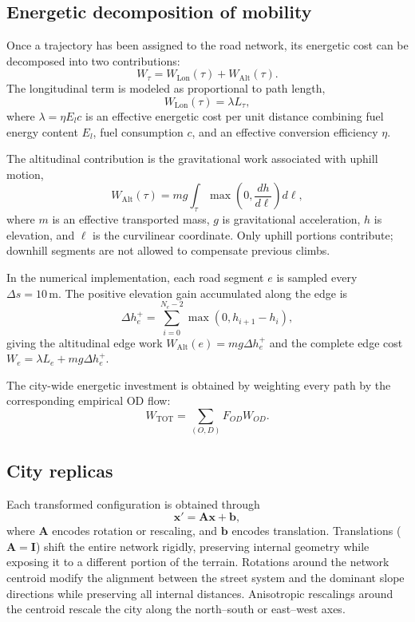 \documentclass[twocolumn,amsmath,amssymb,floatfix,nature,shownopacs,footinbib,superscriptaddress]{revtex4-2}
\begin{document}
\subsection*{Energetic decomposition of mobility}

Once a trajectory has been assigned to the road network, its energetic cost can be decomposed into two contributions:
\[
W_\tau = W_{\mathrm{Lon}}(\tau)+W_{\mathrm{Alt}}(\tau).
\]
The longitudinal term is modeled as proportional to path length,
\[
W_{\mathrm{Lon}}(\tau)=\lambda L_\tau,
\]
where $\lambda=\eta E_l c$ is an effective energetic cost per unit distance combining fuel energy content $E_l$, fuel consumption $c$, and an effective conversion efficiency $\eta$.

The altitudinal contribution is the gravitational work associated with uphill motion,
\[
W_{\mathrm{Alt}}(\tau) = m g \int_\tau \max\!\left(0,\frac{dh}{d\ell}\right) d\ell,
\]
where $m$ is an effective transported mass, $g$ is gravitational acceleration, $h$ is elevation, and $\ell$ is the curvilinear coordinate. Only uphill portions contribute; downhill segments are not allowed to compensate previous climbs.

In the numerical implementation, each road segment $e$ is sampled every $\Delta s=10\,\mathrm{m}$. The positive elevation gain accumulated along the edge is
\[
\Delta h_e^{+} = \sum_{i=0}^{N_e-2} \max(0,h_{i+1}-h_i),
\]
giving the altitudinal edge work $W_{\mathrm{Alt}}(e)=m g \Delta h_e^{+}$ and the complete edge cost $W_e = \lambda L_e + m g \Delta h_e^{+}$.

The city-wide energetic investment is obtained by weighting every path by the corresponding empirical OD flow:
\[
W_{\mathrm{TOT}} = \sum_{(O,D)}F_{OD}W_{OD}.
\]

\subsection*{City replicas}

Each transformed configuration is obtained through
\[
\mathbf{x}'=\mathbf{A}\mathbf{x}+\mathbf{b},
\]
where $\mathbf{A}$ encodes rotation or rescaling, and $\mathbf{b}$ encodes translation. Translations ($\mathbf{A}=\mathbf{I}$) shift the entire network rigidly, preserving internal geometry while exposing it to a different portion of the terrain. Rotations around the network centroid modify the alignment between the street system and the dominant slope directions while preserving all internal distances. Anisotropic rescalings around the centroid rescale the city along the north--south or east--west axes.
\end{document}
